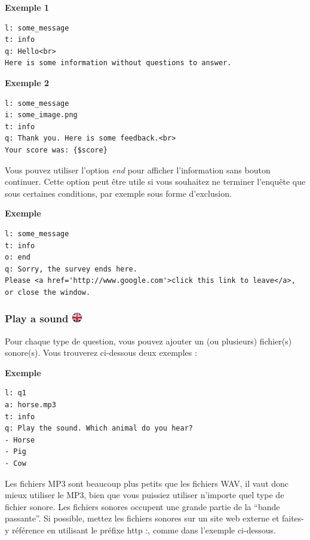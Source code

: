\documentclass[
]{book}
\begin{document}
\textbf{Exemple 1}

\begin{verbatim}
l: some_message
t: info
q: Hello<br>
Here is some information without questions to answer.
\end{verbatim}

\textbf{Exemple 2}

\begin{verbatim}
l: some_message
i: some_image.png
t: info
q: Thank you. Here is some feedback.<br>
Your score was: {$score}
\end{verbatim}

Vous pouvez utiliser l'option \emph{end} pour afficher l'information
sans bouton continuer. Cette option peut être utile si vous souhaitez ne
terminer l'enquête que sous certaines conditions, par exemple sous forme
d'exclusion.

\textbf{Exemple}

\begin{verbatim}
l: some_message
t: info
o: end
q: Sorry, the survey ends here.
Please <a href='http://www.google.com'>click this link to leave</a>, or close the window.
\end{verbatim}

\hypertarget{play-a-sound}{%
\subsubsection[Play a sound ]{\texorpdfstring{Play a sound
\href{https://www.psytoolkit.org/doc3.1.0/online-survey-syntax.html\#sound}{\protect\includegraphics{img/ukflag.png}}}{Play a sound }}\label{play-a-sound}}

Pour chaque type de question, vous pouvez ajouter un (ou plusieurs)
fichier(s) sonore(s). Vous trouverez ci-dessous deux exemples :

\textbf{Exemple}

\begin{verbatim}
l: q1
a: horse.mp3
t: info
q: Play the sound. Which animal do you hear?
- Horse
- Pig
- Cow
\end{verbatim}

Les fichiers MP3 sont beaucoup plus petits que les fichiers WAV, il vaut
donc mieux utiliser le MP3, bien que vous puissiez utiliser n'importe
quel type de fichier sonore. Les fichiers sonores occupent une grande
partie de la ``bande passante''. Si possible, mettez les fichiers
sonores sur un site web externe et faites-y référence en utilisant le
préfixe http :, comme dans l'exemple ci-dessous.
\end{document}
